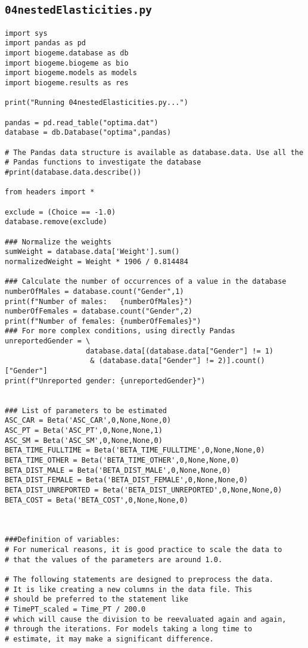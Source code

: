 \documentclass[12pt,a4paper]{article}
\begin{document}
\subsection{\lstinline$04nestedElasticities.py$}
\label{sec:04nestedElasticities}

\begin{lstlisting}[style=numbers]
import sys
import pandas as pd
import biogeme.database as db
import biogeme.biogeme as bio
import biogeme.models as models
import biogeme.results as res

print("Running 04nestedElasticities.py...")

pandas = pd.read_table("optima.dat")
database = db.Database("optima",pandas)

# The Pandas data structure is available as database.data. Use all the
# Pandas functions to investigate the database
#print(database.data.describe())

from headers import *

exclude = (Choice == -1.0)
database.remove(exclude)

### Normalize the weights
sumWeight = database.data['Weight'].sum()
normalizedWeight = Weight * 1906 / 0.814484

### Calculate the number of occurrences of a value in the database
numberOfMales = database.count("Gender",1)
print(f"Number of males:   {numberOfMales}")
numberOfFemales = database.count("Gender",2)
print(f"Number of females: {numberOfFemales}")
### For more complex conditions, using directly Pandas
unreportedGender = \
                   database.data[(database.data["Gender"] != 1)
                    & (database.data["Gender"] != 2)].count()["Gender"]
print(f"Unreported gender: {unreportedGender}")


### List of parameters to be estimated
ASC_CAR = Beta('ASC_CAR',0,None,None,0)
ASC_PT = Beta('ASC_PT',0,None,None,1)
ASC_SM = Beta('ASC_SM',0,None,None,0)
BETA_TIME_FULLTIME = Beta('BETA_TIME_FULLTIME',0,None,None,0)
BETA_TIME_OTHER = Beta('BETA_TIME_OTHER',0,None,None,0)
BETA_DIST_MALE = Beta('BETA_DIST_MALE',0,None,None,0)
BETA_DIST_FEMALE = Beta('BETA_DIST_FEMALE',0,None,None,0)
BETA_DIST_UNREPORTED = Beta('BETA_DIST_UNREPORTED',0,None,None,0)
BETA_COST = Beta('BETA_COST',0,None,None,0)



###Definition of variables:
# For numerical reasons, it is good practice to scale the data to
# that the values of the parameters are around 1.0.

# The following statements are designed to preprocess the data.
# It is like creating a new columns in the data file. This
# should be preferred to the statement like
# TimePT_scaled = Time_PT / 200.0
# which will cause the division to be reevaluated again and again,
# through the iterations. For models taking a long time to
# estimate, it may make a significant difference.


\end{lstlisting}
\end{document}
